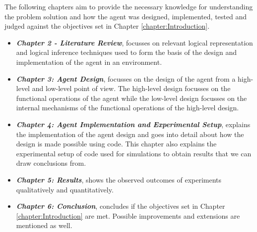 The following chapters aim to provide the necessary knowledge for understanding the problem solution and how the agent was designed, implemented, tested and judged against the objectives set in Chapter \ref{chapter:Introduction}. 

\begin{itemize}
	

	\item \textbf{\textit{Chapter 2 -  Literature Review}}, focusses on relevant logical representation and logical inference techniques used to form the basis of the design and implementation of the agent in an environment.

	\item \textbf{\textit{Chapter 3: Agent Design}}, focusses on the design of the agent from a high-level and low-level point of view. The high-level design focusses on the functional operations of the agent while the low-level design focusses on the internal mechanisms of the functional operations of the high-level design.
	
	\item \textbf{\textit{Chapter 4: Agent Implementation and Experimental Setup}}, explains the implementation of the agent design and goes into detail about how the design is made possible using code. This chapter also explains the experimental setup of code used for simulations to obtain results that we can draw conclusions from. 
	
	\item \textbf{\textit{Chapter 5: Results}}, shows the observed outcomes of experiments qualitatively and quantitatively. 
	
	\item \textbf{\textit{Chapter 6: Conclusion}}, concludes if the objectives set in Chapter \ref{chapter:Introduction} are met. Possible improvements and extensions are mentioned as well.
\end{itemize}
















